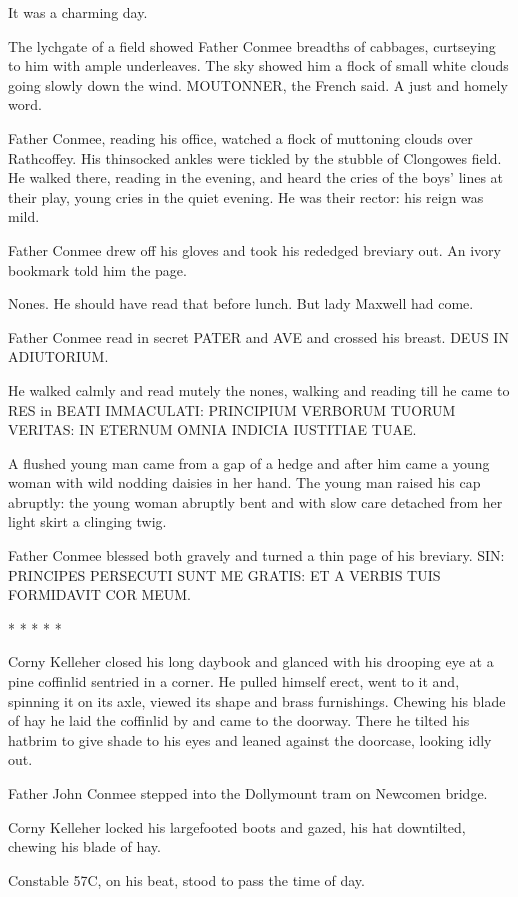 It was a charming day.

The lychgate of a field showed Father Conmee breadths of cabbages,
curtseying to him with ample underleaves. The sky showed him a flock of
small white clouds going slowly down the wind. MOUTONNER, the French
said. A just and homely word.

Father Conmee, reading his office, watched a flock of muttoning
clouds over Rathcoffey. His thinsocked ankles were tickled by the stubble
of Clongowes field. He walked there, reading in the evening, and heard the
cries of the boys' lines at their play, young cries in the quiet evening.
He was their rector: his reign was mild.

Father Conmee drew off his gloves and took his rededged breviary out.
An ivory bookmark told him the page.

Nones. He should have read that before lunch. But lady Maxwell had come.

Father Conmee read in secret PATER and AVE and crossed his breast.
DEUS IN ADIUTORIUM.

He walked calmly and read mutely the nones, walking and reading till
he came to RES in BEATI IMMACULATI: PRINCIPIUM VERBORUM TUORUM VERITAS:
IN ETERNUM OMNIA INDICIA IUSTITIAE TUAE.

A flushed young man came from a gap of a hedge and after him came
a young woman with wild nodding daisies in her hand. The young man
raised his cap abruptly: the young woman abruptly bent and with slow care
detached from her light skirt a clinging twig.

Father Conmee blessed both gravely and turned a thin page of his
breviary. SIN: PRINCIPES PERSECUTI SUNT ME GRATIS: ET A VERBIS TUIS
FORMIDAVIT COR MEUM.


    * * * * *


Corny Kelleher closed his long daybook and glanced with his
drooping eye at a pine coffinlid sentried in a corner. He pulled himself
erect, went to it and, spinning it on its axle, viewed its shape and brass
furnishings. Chewing his blade of hay he laid the coffinlid by and came to
the doorway. There he tilted his hatbrim to give shade to his eyes and
leaned against the doorcase, looking idly out.

Father John Conmee stepped into the Dollymount tram on
Newcomen bridge.

Corny Kelleher locked his largefooted boots and gazed, his hat
downtilted, chewing his blade of hay.

Constable 57C, on his beat, stood to pass the time of day.


